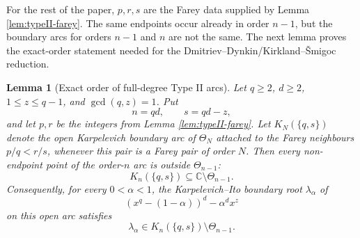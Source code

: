 \documentclass[11pt]{article}
\newtheorem{lemma}[theorem]{Lemma}
\theoremstyle{definition}
\theoremstyle{remark}
\begin{document}
For the rest of the paper, $p,r,s$ are the Farey data supplied by Lemma \ref{lem:typeII-farey}.  The same endpoints occur already in order $n-1$, but the boundary arcs for orders $n-1$ and $n$ are not the same.  The next lemma proves the exact-order statement needed for the Dmitriev--Dynkin/Kirkland--\v Smigoc reduction.

\begin{lemma}[Exact order of full-degree Type II arcs]
\label{lem:typeII-exact-order}
Let $q\ge2$, $d\ge2$, $1\le z\le q-1$, and $\gcd(q,z)=1$.  Put
\[
        n=qd,
        \qquad s=qd-z,
\]
and let $p,r$ be the integers from Lemma \ref{lem:typeII-farey}.  Let $K_N(\{q,s\})$ denote the open Karpelevich boundary arc of $\Theta_N$ attached to the Farey neighbours $p/q<r/s$, whenever this pair is a Farey pair of order $N$.  Then every non-endpoint point of the order-$n$ arc is outside $\Theta_{n-1}$:
\[
        K_n(\{q,s\})\subseteq \mathbb C\setminus\Theta_{n-1} .
\]
Consequently, for every $0<\alpha<1$, the Karpelevich--Ito boundary root $\lambda_\alpha$ of
\[
        (x^q-(1-\alpha))^d-\alpha^d x^z
\]
on this open arc satisfies
\[
        \lambda_\alpha\in K_n(\{q,s\})\setminus\Theta_{n-1}.
\]
\end{lemma}
\end{document}
